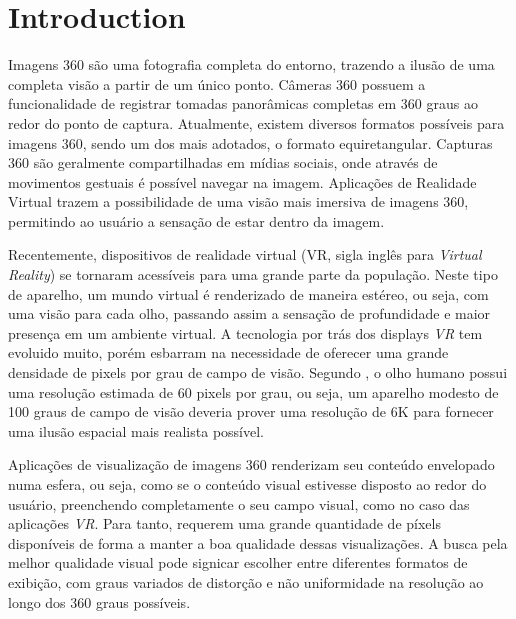 \documentclass[conference]{IEEEtran}
\begin{document}
\section{Introduction}

Imagens 360 são uma fotografia completa do entorno, trazendo a ilusão de uma completa visão a partir de um único ponto. Câmeras 360 possuem a funcionalidade de registrar tomadas panorâmicas completas em 360 graus ao redor do ponto de captura. Atualmente, existem diversos formatos possíveis para imagens 360, sendo um dos mais adotados, o formato equiretangular. Capturas 360 são geralmente compartilhadas em mídias sociais, onde através de movimentos gestuais é possível navegar na imagem. Aplicações de Realidade Virtual trazem a possibilidade de uma visão mais imersiva de imagens 360, permitindo ao usuário a sensação de estar dentro da imagem.

Recentemente, dispositivos de realidade virtual (VR, sigla inglês para \textit{Virtual Reality}) se tornaram acessíveis para uma grande parte da população. Neste tipo de aparelho, um mundo virtual é renderizado de maneira estéreo, ou seja, com uma visão para cada olho, passando assim a sensação de profundidade e maior presença em um ambiente virtual. A tecnologia por trás dos displays \textit{VR} tem evoluido muito, porém esbarram na necessidade de oferecer uma grande densidade de pixels por grau de campo de visão. Segundo \cite{va1965visual}, o olho humano possui uma resolução estimada de 60 pixels por grau, ou seja, um aparelho modesto de 100 graus de campo de visão deveria prover uma resolução de 6K para fornecer uma ilusão espacial mais realista possível.

Aplicações de visualização de imagens 360 renderizam seu conteúdo envelopado numa esfera, ou seja, como se o conteúdo visual estivesse disposto ao redor do usuário, preenchendo completamente o seu campo visual, como no caso das aplicações \textit{VR}. Para tanto, requerem uma grande quantidade de píxels disponíveis de forma a manter a boa qualidade dessas visualizações. A busca pela melhor qualidade visual pode signicar escolher entre diferentes formatos de exibição, com graus variados de distorção e não uniformidade na resolução ao longo dos 360 graus possíveis.
\end{document}
